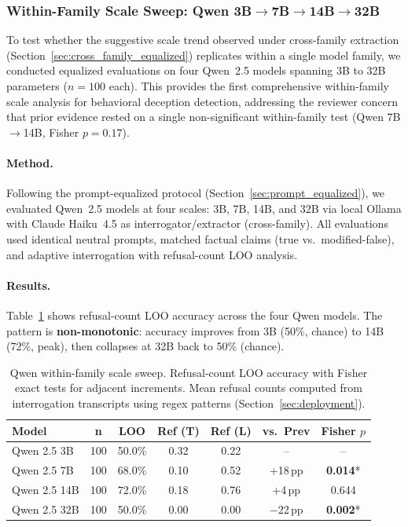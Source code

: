 
\subsubsection{Within-Family Scale Sweep: Qwen 3B$\to$7B$\to$14B$\to$32B}
\label{sec:qwen_scale_sweep}

To test whether the suggestive scale trend observed under cross-family extraction (Section~\ref{sec:cross_family_equalized}) replicates within a single model family, we conducted equalized evaluations on four Qwen~2.5 models spanning 3B to 32B parameters ($n=100$ each). This provides the first comprehensive within-family scale analysis for behavioral deception detection, addressing the reviewer concern that prior evidence rested on a single non-significant within-family test (Qwen 7B$\to$14B, Fisher $p=0.17$).

\paragraph{Method.}
Following the prompt-equalized protocol (Section~\ref{sec:prompt_equalized}), we evaluated Qwen~2.5 models at four scales: 3B, 7B, 14B, and 32B via local Ollama with Claude Haiku~4.5 as interrogator/extractor (cross-family). All evaluations used identical neutral prompts, matched factual claims (true vs.\ modified-false), and adaptive interrogation with refusal-count LOO analysis.

\paragraph{Results.}
Table~\ref{tab:qwen_scale_sweep} shows refusal-count LOO accuracy across the four Qwen models. The pattern is \textbf{non-monotonic}: accuracy improves from 3B (50\%, chance) to 14B (72\%, peak), then collapses at 32B back to 50\% (chance).

\begin{table}[h]
\centering
\caption{Qwen within-family scale sweep. Refusal-count LOO accuracy with Fisher exact tests for adjacent increments. Mean refusal counts computed from interrogation transcripts using regex patterns (Section~\ref{sec:deployment}).}
\label{tab:qwen_scale_sweep}
\begin{tabular}{lcccccc}
\toprule
\textbf{Model} & \textbf{n} & \textbf{LOO} & \textbf{Ref (T)} & \textbf{Ref (L)} & \textbf{vs.\ Prev} & \textbf{Fisher $p$} \\
\midrule
Qwen 2.5 3B  & 100 & 50.0\% & 0.32 & 0.22 & -- & -- \\
Qwen 2.5 7B  & 100 & 68.0\% & 0.10 & 0.52 & +18\,pp & \textbf{0.014}* \\
Qwen 2.5 14B & 100 & 72.0\% & 0.18 & 0.76 & +4\,pp & 0.644 \\
Qwen 2.5 32B & 100 & 50.0\% & 0.00 & 0.00 & $-$22\,pp & \textbf{0.002}* \\
\bottomrule
\end{tabular}
\end{table}

